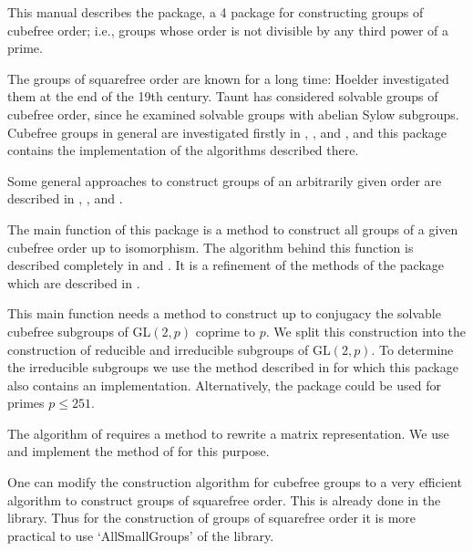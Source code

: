 



This manual describes the {\Cubefree}  package,
a {\GAP} 4 package for constructing groups of cubefree order; i.e., groups
whose order is not divisible by any third power of a prime.
 
The groups of squarefree order are known for a long time: Hoelder
\cite{Hol93} investigated them at the end of the 19th century. Taunt
\cite{Tau55} has considered solvable groups of cubefree order, since he
examined solvable groups with abelian Sylow subgroups. Cubefree groups in
general are investigated firstly in \cite{Di05}, \cite{DiEi05}, and \cite{DiEi05add}, and this
package contains the implementation of the algorithms described
there.

Some general approaches to construct groups of an arbitrarily given order are
described in \cite{BeEia}, \cite{BeEib}, and \cite{BeEiO}.

The main function of this package is a method to construct 
all groups of a given cubefree order up to isomorphism. The algorithm behind this function is
described completely in \cite{Di05} and \cite{DiEi05}. It is a refinement of
the methods of the {\GrpConst} package which are described in \cite{GrpConst}.

This main function needs a method to construct up to conjugacy the solvable
cubefree subgroups of GL$(2,p)$ coprime to $p$. We split this construction
into the construction of reducible and irreducible subgroups of GL$(2,p)$. To determine the
irreducible subgroups we use the method described in \cite{FlOB05} for which this package
also contains an implementation. Alternatively, the {\IrredSol} package
\cite{Irredsol} could be used for primes $p\le 251$.

The algorithm of \cite{FlOB05} requires a method to rewrite a matrix
representation. We use and implement the method of \cite{GlHo97} for this purpose.

One can modify the construction algorithm for cubefree groups to a very
efficient algorithm to construct groups of squarefree order. This is already
done in the  {\SmallGroups} library. Thus for the construction of groups of squarefree order it is more practical to
use `AllSmallGroups' of the {\SmallGroups} library. 

